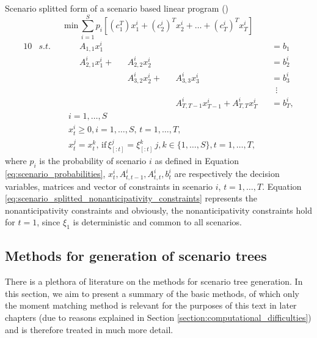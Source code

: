 \begin{defn}
\label{eq:scenario_splitted_linear_programming_formulation}
{\normalfont Scenario splitted form of a scenario based linear program
{\normalfont (\cite{defourny_scenario_trees_scenario_splitted_formulation}})}
\footnotesize
\begin{equation*}
\mathrm{min} \, \sum_{i=1}^S p_i \left[ (c_1^T)x_1^i + (c_2^i)^Tx_2^i + \dots + (c_T^i)^Tx_T^i  \right]
\end{equation*}
\vspace{-0.5cm}
\begin{alignat}{10}
& s.t. && \, && A_{1,1}x_1^i && && \,&&=b_1 \nonumber \\
& && && A_{2,1}^ix_1^i  + &&A_{2,2}^ix_2^i && &&=b_2^i \nonumber \\
& && && && A_{3,2}^ix_{2}^i  + && A_{3,3}^ix_{3}^i &&=b_3^i \nonumber \\
& && && && && &&  \, \, \, \vdots \nonumber \\
& && && && && A_{T,T-1}^ix_{T-1}^i  +  A_{T,T}^ix_{T}^i &&=b_{T}^i, \nonumber
\end{alignat}
\vspace{-0.5cm}
\begin{align}
\label{eq:scenario_splitted_nonanticipativity_constraints}
& i=1,\dots,S \nonumber \\
&  x_{t}^i \geq 0, i=1,\dots,S, \, t=1,\dots,T,  \nonumber \\
& x_t^j=x_t^k, \, \mathrm{if} \, \xi_{[:t]}^j=\xi_{[:t]}^k \, j,k \in \{1,\dots,S\} , t=1,\dots,T,
\end{align}
\normalsize
where $p_i$ is the probability of scenario $i$ as defined in Equation \ref{eq:scenario_probabilities}, $x_t^i, A_{t,t-1}^i, A_{t,t}^i, b_{t}^i$ are respectively the decision variables, matrices and vector of constraints in scenario $i$, $t=1,\dots,T$. Equation \ref{eq:scenario_splitted_nonanticipativity_constraints} represents the nonanticipativity constraints and obviously, the nonanticipativity constraints hold for $t=1$, since $\xi_1$ is deterministic and common to all scenarios.
\end{defn}
\subsection{Methods for generation of scenario trees}
There is a plethora of literature on the methods for scenario tree generation. In this section, we aim to present a summary of the basic methods, of which only the moment matching method is relevant for the purposes of this text in later chapters (due to reasons explained in Section \ref{section:computational_difficulties}) and is therefore treated in much more detail. 

